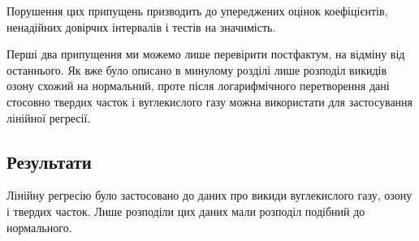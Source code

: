 Порушення цих припущень призводить до упереджених оцінок коефіцієнтів, ненадійних довірчих інтервалів і тестів на значимість.

Перші два припущення ми можемо лише перевірити постфактум, на відміну від останнього. 
Як вже було описано в минулому розділі лише розподіл викидів озону схожий на нормальний, проте після логарифмічного перетворення дані стосовно твердих часток і вуглекислого газу можна використати для застосування лінійної регресії.

\subsection{Результати}

Лінійну регресію було застосовано до даних про викиди вуглекислого газу, озону і твердих часток. 
Лише розподіли цих даних мали розподіл подібний до нормального. 


\begin{center}
    \vspace{1cm}

\end{center}

